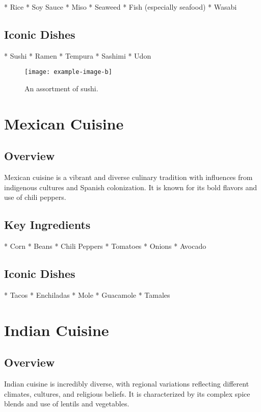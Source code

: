 \documentclass{article}
\begin{document}
*   Rice
*   Soy Sauce
*   Miso
*   Seaweed
*   Fish (especially seafood)
*   Wasabi

\subsection{Iconic Dishes}

*   Sushi
*   Ramen
*   Tempura
*   Sashimi
*   Udon

\begin{figure}[h!]
\centering
\texttt{[image: example-image-b]} %
\caption{An assortment of sushi.}
\end{figure}

\section{Mexican Cuisine}

\subsection{Overview}

Mexican cuisine is a vibrant and diverse culinary tradition with influences from indigenous cultures and Spanish colonization. It is known for its bold flavors and use of chili peppers.

\subsection{Key Ingredients}

*   Corn
*   Beans
*   Chili Peppers
*   Tomatoes
*   Onions
*   Avocado

\subsection{Iconic Dishes}

*   Tacos
*   Enchiladas
*   Mole
*   Guacamole
*   Tamales

\section{Indian Cuisine}

\subsection{Overview}

Indian cuisine is incredibly diverse, with regional variations reflecting different climates, cultures, and religious beliefs.  It is characterized by its complex spice blends and use of lentils and vegetables.
\end{document}
